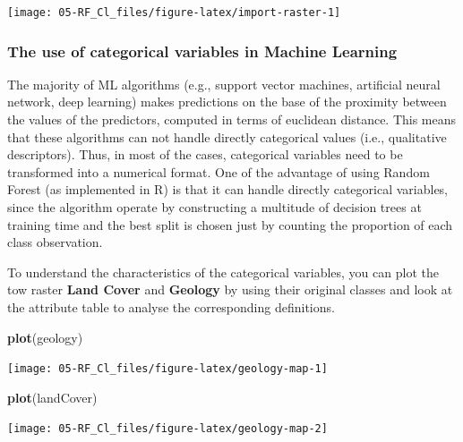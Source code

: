 \documentclass[
]{article}
\newenvironment{Shaded}{\begin{snugshade}}{\end{snugshade}}
\newcommand{\FunctionTok}[1]{\textcolor[rgb]{0.13,0.29,0.53}{\textbf{#1}}}
\newcommand{\NormalTok}[1]{#1}
\begin{document}
\begin{center}\texttt{[image: 05-RF\_Cl\_files/figure-latex/import-raster-1]} \end{center}

\subsubsection{The use of categorical variables in Machine Learning}\label{the-use-of-categorical-variables-in-machine-learning}

The majority of ML algorithms (e.g., support vector machines, artificial neural network, deep learning) makes predictions on the base of the proximity between the values of the predictors, computed in terms of euclidean distance.
This means that these algorithms can not handle directly categorical values (i.e., qualitative descriptors).
Thus, in most of the cases, categorical variables need to be transformed into a numerical format.
One of the advantage of using Random Forest (as implemented in R) is that it can handle directly categorical variables, since the algorithm operate by constructing a multitude of decision trees at training time and the best split is chosen just by counting the proportion of each class observation.

To understand the characteristics of the categorical variables, you can plot the tow raster \textbf{Land Cover} and \textbf{Geology} by using their original classes and look at the attribute table to analyse the corresponding definitions.

\begin{Shaded}
\begin{Highlighting}[]
\FunctionTok{plot}\NormalTok{(geology)}
\end{Highlighting}
\end{Shaded}

\begin{center}\texttt{[image: 05-RF\_Cl\_files/figure-latex/geology-map-1]} \end{center}

\begin{Shaded}
\begin{Highlighting}[]
\FunctionTok{plot}\NormalTok{(landCover)}
\end{Highlighting}
\end{Shaded}

\begin{center}\texttt{[image: 05-RF\_Cl\_files/figure-latex/geology-map-2]} \end{center}
\end{document}
